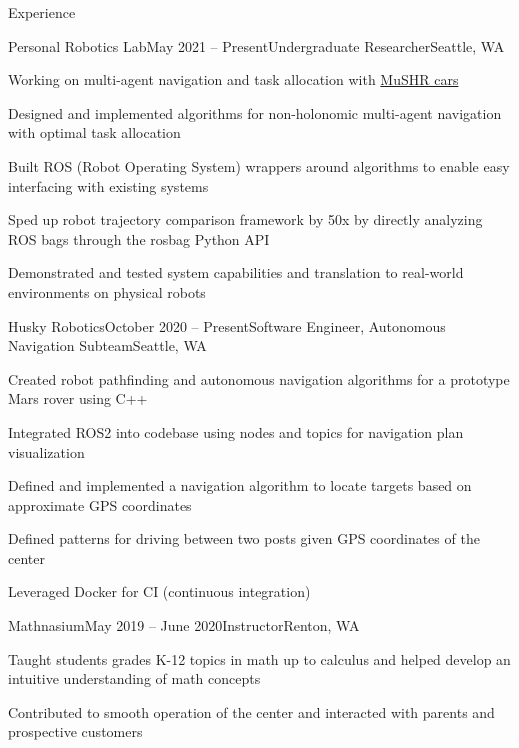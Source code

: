 \documentclass{resume} %
\begin{document}
\begin{rSection}{Experience}

\begin{rSubsection}{Personal Robotics Lab}{May 2021 – Present}{Undergraduate Researcher}{Seattle, WA}
\item Working on multi-agent navigation and task allocation with \href{https://mushr.io}{MuSHR cars}
\item Designed and implemented algorithms for non-holonomic multi-agent navigation with optimal task allocation
\item Built ROS (Robot Operating System) wrappers around algorithms to enable easy interfacing with existing systems
\item Sped up robot trajectory comparison framework by 50x by directly analyzing ROS bags through the rosbag Python API
\item Demonstrated and tested system capabilities and translation to real-world environments on physical robots
\end{rSubsection}

\begin{rSubsection}{Husky Robotics}{October 2020 – Present}{Software Engineer, Autonomous Navigation Subteam}{Seattle, WA}
\item Created robot pathfinding and autonomous navigation algorithms for a prototype Mars rover using C++
\item Integrated ROS2 into codebase using nodes and topics for navigation plan visualization
\item Defined and implemented a navigation algorithm to locate targets based on approximate GPS coordinates
\item Defined patterns for driving between two posts given GPS coordinates of the center
\item Leveraged Docker for CI (continuous integration)
\end{rSubsection}

\begin{rSubsection}{Mathnasium}{May 2019 – June 2020}{Instructor}{Renton, WA}
\item Taught students grades K-12 topics in math up to calculus and helped develop an intuitive understanding of math concepts
\item Contributed to smooth operation of the center and interacted with parents and prospective customers
\end{rSubsection}


\end{rSection}
\end{document}
